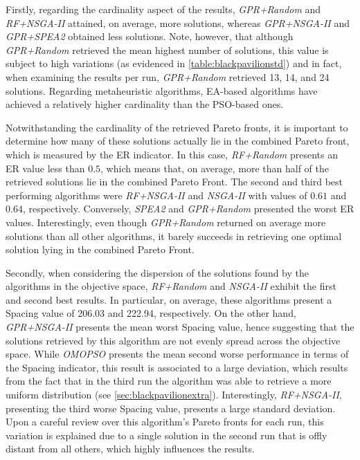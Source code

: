 Firstly, regarding the cardinality aspect of the results, \textit{GPR+Random} and \textit{RF+NSGA-II} attained, on average, more solutions, whereas \textit{GPR+NSGA-II} and \textit{GPR+SPEA2} obtained less solutions. Note, however, that although \textit{GPR+Random} retrieved the mean highest number of solutions, this value is subject to high variations (as evidenced in \cref{table:blackpavilionstd}) and in fact, when examining the results per run, \textit{GPR+Random} retrieved 13, 14, and 24 solutions. Regarding metaheuristic algorithms, \ac{EA}-based algorithms have achieved a relatively higher cardinality than the \ac{PSO}-based ones. 

Notwithstanding the cardinality of the retrieved Pareto fronts, it is important to determine how many of these solutions actually lie in the combined Pareto front, which is measured by the \ac{ER} indicator. In this case, \textit{RF+Random} presents an \ac{ER} value less than $0.5$, which means that, on average, more than half of the retrieved solutions lie in the combined Pareto Front. The second and third best performing algorithms were \textit{RF+NSGA-II} and \textit{\ac{NSGA-II}} with values of $0.61$ and $0.64$, respectively. Conversely, \textit{\ac{SPEA2}} and \textit{GPR+Random} presented the worst \ac{ER} values. Interestingly, even though \textit{GPR+Random} returned on average more solutions than all other algorithms, it barely succeeds in retrieving one optimal solution lying in the combined Pareto Front.

Secondly, when considering the dispersion of the solutions found by the algorithms in the objective space, \textit{RF+Random} and \textit{\ac{NSGA-II}} exhibit the first and second best results. In particular, on average, these algorithms present a Spacing value of 206.03 and 222.94, respectively. On the other hand, \textit{GPR+NSGA-II} presents the mean worst Spacing value, hence suggesting that the solutions retrieved by this algorithm are not evenly spread across the objective space. While \textit{OMOPSO} presents the mean second worse performance in terms of the Spacing indicator, this result is associated to a large deviation, which results from the fact that in the third run the algorithm was able to retrieve a more uniform distribution (see \cref{sec:blackpavilionextra}). Interestingly, \textit{RF+NSGA-II}, presenting the third worse Spacing value, presents a large standard deviation. Upon a careful review over this algorithm's Pareto fronts for each run, this variation is explained due to a single solution in the second run that is offly distant from all others, which highly influences the results. 

